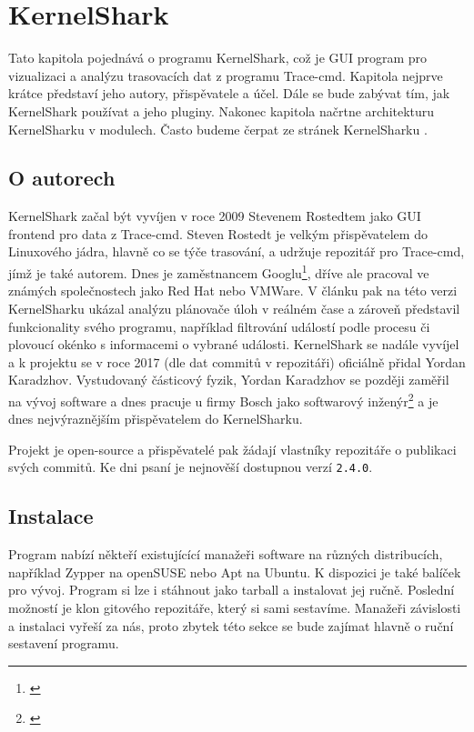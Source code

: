\chapter{KernelShark}
\label{kap-kernel-shark}

Tato kapitola pojednává o programu KernelShark, což je GUI program pro vizualizaci a analýzu trasovacích dat z programu Trace-cmd. Kapitola nejprve krátce představí jeho autory, přispěvatele a účel. Dále se bude zabývat tím, jak KernelShark používat a jeho pluginy. Nakonec kapitola načrtne architekturu KernelSharku v modulech. Často budeme čerpat ze stránek KernelSharku \cite{KernelShark-Pages}.

\section{O autorech}

KernelShark začal být vyvíjen v roce 2009 Stevenem Rostedtem jako GUI frontend pro data z Trace-cmd. Steven Rostedt je velkým přispěvatelem do Linuxového jádra, hlavně co se týče trasování, a udržuje repozitář pro Trace-cmd, jímž je také autorem. Dnes je zaměstnancem Googlu\footnote{ \cite{SR-LinkedIn}}, dříve ale pracoval ve známých společnostech jako Red Hat nebo VMWare. V článku \cite{LWM-Kshark} pak na této verzi KernelSharku ukázal analýzu plánovače úloh v reálném čase a zároveň představil funkcionality svého programu, například filtrování událostí podle procesu či plovoucí okénko s informacemi o vybrané události. KernelShark se nadále vyvíjel a k projektu se v roce 2017 (dle dat commitů v repozitáři) oficiálně přidal Yordan Karadzhov. Vystudovaný částicový fyzik, Yordan Karadzhov se později zaměřil na vývoj software a dnes pracuje u firmy Bosch jako softwarový inženýr\footnote{ \cite{YK-LinkedIn}} a je dnes nejvýraznějším přispěvatelem do KernelSharku.

Projekt je open-source a přispěvatelé pak žádají vlastníky repozitáře o publikaci svých commitů. Ke dni psaní je nejnověší dostupnou verzí \texttt{2.4.0}.

\section{Instalace}

Program nabízí někteří existujícící manažeři software na různých distribucích, například Zypper na openSUSE nebo Apt na Ubuntu. K dispozici je také balíček pro vývoj. Program si lze i stáhnout jako tarball a instalovat jej ručně. Poslední možností je klon gitového repozitáře, který si sami sestavíme. Manažeři závislosti a instalaci vyřeší za nás, proto zbytek této sekce se bude zajímat hlavně o ruční sestavení programu.

